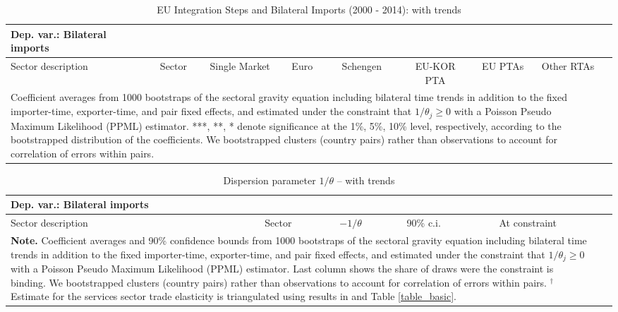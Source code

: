 \documentclass[a4paper,12pt]{article}
\begin{document}
\begin{appendix}
\renewcommand{\tabcolsep}{.2cm}



\begin{table}[h]
\caption{EU Integration Steps and Bilateral Imports (2000 - 2014): with trends}
\label{table_sector_trend}\centering \vspace*{0.5cm}
{\scriptsize
\hspace*{-1cm}\begin{tabular}{lcccccccc}
Dep. var.: Bilateral imports\\
\toprule
Sector description & Sector & Single Market & Euro & Schengen & EU-KOR PTA & EU PTAs & Other RTAs \\
\midrule

\bottomrule
\multicolumn{8}{l}{\parbox[t]{6.5in}{Coefficient averages from 1000 bootstraps of the sectoral gravity equation including bilateral time trends in addition to the fixed importer-time, exporter-time, and pair fixed effects, and estimated under the constraint that $1/\theta_j\geq 0$ with a Poisson Pseudo Maximum Likelihood (PPML) estimator.  ***, **, * denote significance at the 1\%, 5\%, 10\% level, respectively, according to the bootstrapped distribution of the coefficients. We bootstrapped clusters (country pairs) rather than observations to account for correlation of errors within pairs. }}
\end{tabular}
}
\end{table}

\renewcommand{\tabcolsep}{.6cm}

\begin{table}[t]
\caption{Dispersion parameter $1/\theta$ -- with trends}
\label{table_dispersion_trend}\centering \vspace*{0.5cm}
{\scriptsize
\begin{tabular}{lcccccc}
Dep. var.: Bilateral imports\\
\toprule
Sector description & Sector & $-1/\theta$ & 90\% c.i. & At constraint\\
\midrule

\bottomrule
\multicolumn{5}{l}{\parbox[t]{5.9in}{\textbf{Note.} Coefficient averages and 90\% confidence bounds from 1000 bootstraps of the sectoral gravity equation including bilateral time trends in addition to the fixed importer-time, exporter-time, and pair fixed effects, and estimated under the constraint that $1/\theta_j\geq 0$ with a Poisson Pseudo Maximum Likelihood (PPML) estimator. Last column shows the share of draws were the constraint is binding. We bootstrapped clusters (country pairs) rather than observations to account for correlation of errors within pairs. $^\dagger$ Estimate for the services sector trade elasticity is triangulated using results in \cite{egger2012trade} and Table \ref{table_basic}. }}
\end{tabular}}
\end{table}


\end{appendix}
\end{document}
